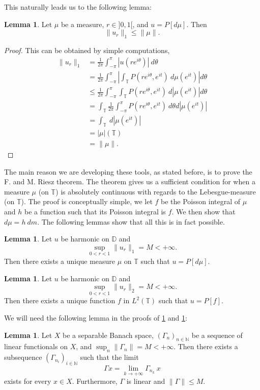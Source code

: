 \documentclass[a4paper,12pt,twoside,BCOR=10mm]{scrbook}
\theoremstyle{definition}
\theoremstyle{definition}
\newtheorem{lemma}[theorem]{Lemma}
\theoremstyle{definition}
\begin{document}
This naturally leads us to the following lemma:
\begin{lemma}
\label{FMRlemma1}
Let $\mu$ be a measure, $r \in ]0, 1[$, and $u = P[d\mu]$.
Then
\[
	\|u_r\|_1 \leq \|\mu\|.
\]
\end{lemma}
\begin{proof}
This can be obtained by simple computations,
\begin{align*}
	\|u_r\|_1
	&= \frac{1}{2\pi} \int_{-\pi}^{\pi} |u(re^{i\theta})|\ d\theta\\
	&= \frac{1}{2\pi} \int_{-\pi}^{\pi} \left | \int_{\mathbb{T}} P(re^{i\theta}, e^{it})\ d\mu(e^{it}) \right | d\theta\\
	&\leq \frac{1}{2\pi} \int_{-\pi}^{\pi} \int_{\mathbb{T}} P(re^{i\theta}, e^{it})\ d|\mu(e^{it})| d\theta\\
	&= \int_{\mathbb{T}} \frac{1}{2\pi} \int_{-\pi}^{\pi} P(re^{i\theta}, e^{it})\ d\theta d|\mu(e^{it})|\\ 
	&= \int_{\mathbb{T}}\ d|\mu(e^{it})|\\
	&= |\mu|(\mathbb{T})\\
	&= \|\mu\|.
\end{align*}
\end{proof}
The main reason we are developing these tools, as stated before, is to prove the F. and M. Riesz theorem.
The theorem gives us a sufficient condition for when a measure $\mu$ (on $\mathbb{T}$) is absolutely continuous with regards to the Lebesgue-measure (on $\mathbb{T}$).
The proof is conceptually simple, we let $f$ be the Poisson integral of $\mu$ and $h$ be a function such that its Poisson integral is $f$.
We then show that $d\mu = h\ dm$. %
The following lemmas show that all this is in fact possible.
\begin{lemma}
\label{FMRlemma3}
Let $u$ be harmonic on $\mathbb{D}$ and
\[
	\sup_{0 < r < 1} \|u_r\|_1 = M < +\infty.
\]
Then there exists a unique measure $\mu$ on $\mathbb{T}$ such that $u = P[d\mu]$.
\end{lemma}
\begin{lemma}
\label{FMRlemma3b}
Let $u$ be harmonic on $\mathbb{D}$ and
\[
	\sup_{0 < r < 1} \|u_r\|_2 = M < +\infty.
\]
Then there exists a unique function $f$ in $L^2(\mathbb{T})$ such that $u = P[f]$.
\end{lemma}
We will need the following lemma in the proofs of \ref{FMRlemma3} and \ref{FMRlemma3b}:
\begin{lemma}
\label{FMRlemma31}
Let $X$ be a separable Banach space,
	$(\Gamma_n)_{n \in \mathbb{N}}$ be a sequence of linear functionals on $X$,
	and $\sup_n \|\Gamma_n\| = M < +\infty$.
Then there exists a subsequence $(\Gamma_{n_i})_{i \in \mathbb{N}}$ such that the limit 
\[
	\Gamma x = \lim_{k \rightarrow +\infty} \Gamma_{n_k}\ x
\]
exists for every $x \in X$.
Furthermore, $\Gamma$ is linear and $\|\Gamma\| \leq M$.
\end{lemma}
\end{document}

